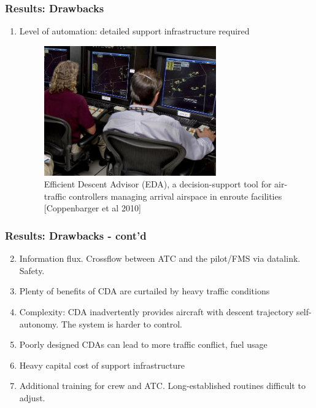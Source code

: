 \documentclass{beamer}
\begin{document}

\begin{frame}
\frametitle{Results: Drawbacks}

\begin{enumerate}[1.]
\item Level of automation: detailed support infrastructure required

\begin{figure}[h!]
\centering
\includegraphics[width=0.7\textwidth]{./figures/EDA.jpg}\\
{\tiny Efficient Descent Advisor (EDA), a decision-support tool for air-traffic controllers managing arrival airspace in enroute facilities [Coppenbarger et al 2010]}
\end{figure}

\end{enumerate}
\end{frame}


\begin{frame}
\frametitle{Results: Drawbacks - cont'd}

\begin{enumerate}[1.]
\setcounter{enumi}{1}
\item Information flux. Crossflow between ATC and the pilot/FMS via datalink. Safety.
\item Plenty of benefits of CDA are curtailed by heavy traffic conditions
\item Complexity: CDA inadvertently provides aircraft with descent trajectory self-autonomy. The system is harder to control.
\item Poorly designed CDAs can lead to more traffic conflict, fuel usage
\item Heavy capital cost of support infrastructure
\item Additional training for crew and ATC. Long-established routines difficult to adjust.

\end{enumerate}

\end{frame}
\end{document}
